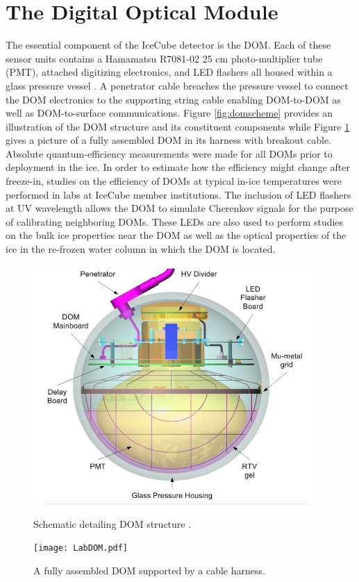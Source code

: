 \documentclass{gatech-thesis}
\begin{document}
\section{The Digital Optical Module}
The essential component of the IceCube detector is the DOM. Each of these sensor units contains a Hamamatsu R7081-02 25 cm photo-multiplier tube (PMT), attached digitizing electronics, and LED flashers all housed within a glass pressure vessel \cite{2006NIMPA.567..214H}. A penetrator cable breaches the pressure vessel to connect the DOM electronics to the supporting string cable enabling DOM-to-DOM as well as DOM-to-surface communications. Figure \ref{fig:domscheme} provides an illustration of the DOM structure and its constituent components while Figure \ref{fig:dompic} gives a picture of a fully assembled DOM in its harness with breakout cable. Absolute quantum-efficiency measurements were made for all DOMs prior to deployment in the ice. In order to estimate how the efficiency might change after freeze-in, studies on the efficiency of DOMs at typical in-ice temperatures were performed in labs at IceCube member institutions. The inclusion of LED flashers at UV wavelength allows the DOM to simulate Cherenkov signals for the purpose of calibrating neighboring DOMs. These LEDs are also used to perform studies on the bulk ice properties near the DOM as well as the optical properties of the ice in the re-frozen water column in which the DOM is located.

\begin{figure}[ht]
\centering
\begin{minipage}[b]{0.45\linewidth}
\includegraphics[width=0.95\textwidth]{DomSchematic.png}
\caption{Schematic detailing DOM structure \cite{2009NIMPA.601..294A}.}
\label{fig:domscheme}
\end{minipage}
\quad
\begin{minipage}[b]{0.45\linewidth}
\begin{center}
\texttt{[image: LabDOM.pdf]}
\end{center}
\caption{A fully assembled DOM supported by a cable harness.}
\label{fig:dompic}
\end{minipage}
\end{figure}
\end{document}
